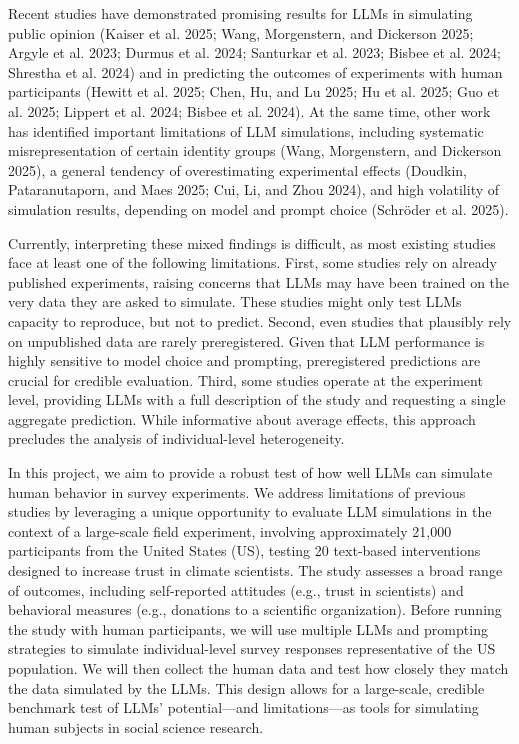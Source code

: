 \documentclass[
  letterpaper,
  DIV=11,
  numbers=noendperiod]{scrartcl}
\begin{document}
Recent studies have demonstrated promising results for LLMs in
simulating public opinion (Kaiser et al. 2025; Wang, Morgenstern, and
Dickerson 2025; Argyle et al. 2023; Durmus et al. 2024; Santurkar et al.
2023; Bisbee et al. 2024; Shrestha et al. 2024) and in predicting the
outcomes of experiments with human participants (Hewitt et al. 2025;
Chen, Hu, and Lu 2025; Hu et al. 2025; Guo et al. 2025; Lippert et al.
2024; Bisbee et al. 2024). At the same time, other work has identified
important limitations of LLM simulations, including systematic
misrepresentation of certain identity groups (Wang, Morgenstern, and
Dickerson 2025), a general tendency of overestimating experimental
effects (Doudkin, Pataranutaporn, and Maes 2025; Cui, Li, and Zhou
2024), and high volatility of simulation results, depending on model and
prompt choice (Schröder et al. 2025).

Currently, interpreting these mixed findings is difficult, as most
existing studies face at least one of the following limitations. First,
some studies rely on already published experiments, raising concerns
that LLMs may have been trained on the very data they are asked to
simulate. These studies might only test LLMs capacity to reproduce, but
not to predict. Second, even studies that plausibly rely on unpublished
data are rarely preregistered. Given that LLM performance is highly
sensitive to model choice and prompting, preregistered predictions are
crucial for credible evaluation. Third, some studies operate at the
experiment level, providing LLMs with a full description of the study
and requesting a single aggregate prediction. While informative about
average effects, this approach precludes the analysis of
individual-level heterogeneity.

In this project, we aim to provide a robust test of how well LLMs can
simulate human behavior in survey experiments. We address limitations of
previous studies by leveraging a unique opportunity to evaluate LLM
simulations in the context of a large-scale field experiment, involving
approximately 21,000 participants from the United States (US), testing
20 text-based interventions designed to increase trust in climate
scientists. The study assesses a broad range of outcomes, including
self-reported attitudes (e.g., trust in scientists) and behavioral
measures (e.g., donations to a scientific organization). Before running
the study with human participants, we will use multiple LLMs and
prompting strategies to simulate individual-level survey responses
representative of the US population. We will then collect the human data
and test how closely they match the data simulated by the LLMs. This
design allows for a large-scale, credible benchmark test of LLMs'
potential---and limitations---as tools for simulating human subjects in
social science research.
\end{document}
